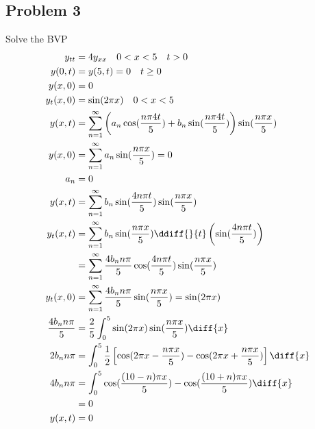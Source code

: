 \documentclass{math}
\begin{document}
\subsection*{Problem 3}
Solve the BVP
\begin{align*}
  y_{tt} &= 4y_{xx} \quad 0<x<5 \quad t>0 \\
  y(0,t) &= y(5,t) = 0 \quad t\ge0 \\
  y(x,0) &= 0 \\
  y_t(x,0) &= \sin(2\pi x) \quad 0<x<5 \\
  y(x,t) &= \sum_{n=1}^{\infty}\left(a_n\cos(\frac{n\pi4t}{5})+
    b_n\sin(\frac{n\pi4t}{5})\right)\sin(\frac{n\pi x}{5}) \\
  y(x,0) &= \sum_{n=1}^{\infty}a_n\sin(\frac{n\pi x}{5}) = 0 \\
  a_n &= 0 \\
  y(x,t) &= \sum_{n=1}^{\infty}
    b_n\sin(\frac{4n\pi t}{5})\sin(\frac{n\pi x}{5}) \\
  y_t(x,t) &= \sum_{n=1}^{\infty}b_n\sin(\frac{n\pi x}{5})
    \ddiff{}{t}\left(\sin(\frac{4n\pi t}{5})\right) \\
  &= \sum_{n=1}^{\infty}\frac{4b_nn\pi}{5}\cos(\frac{4n\pi t}{5})
    \sin(\frac{n\pi x}{5}) \\
  y_t(x,0) &= \sum_{n=1}^{\infty}\frac{4b_nn\pi}{5}\sin(\frac{n\pi x}{5}) =
    \sin(2\pi x) \\
  \frac{4b_nn\pi}{5} &= \frac{2}{5}\int_{0}^{5}\sin(2\pi x)
    \sin(\frac{n\pi x}{5})\diff{x} \\
  2b_nn\pi &= \int_{0}^{5}\frac{1}{2}\left[\cos(2\pi x-
    \frac{n\pi x}{5})-\cos(2\pi x+\frac{n\pi x}{5})\right]\diff{x} \\
  4b_nn\pi &= \int_{0}^{5}
    \cos(\frac{(10-n)\pi x}{5})-\cos(\frac{(10+n)\pi x}{5})\diff{x} \\
  &= 0 \\
  y(x,t) &= 0
\end{align*}
\end{document}
